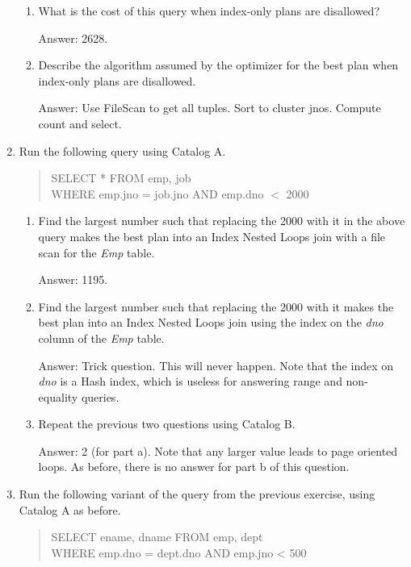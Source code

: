 \begin{enumerate}
\begin{enumerate}
\item
What is the cost of this query when index-only plans are disallowed?

Answer: 2628.

\item
Describe the algorithm assumed by the optimizer for the best plan when
index-only plans are disallowed.

Answer: Use FileScan to get all tuples.  Sort to cluster jnos.
Compute count and select.
\end{enumerate}


\item
Run the following query using Catalog A.
\begin{quote}
	SELECT * FROM emp, job\\
	WHERE emp.jno = job.jno AND emp.dno $<$ 2000
\end{quote}

\begin{enumerate}
\item
Find the largest number such that replacing the 2000 with it in the
above query makes the best plan into an Index Nested Loops join with a
file scan for the {\em Emp} table.

Answer: 1195.

\item
Find the largest number such that replacing the 2000 with it makes the
best plan into an Index Nested Loops join using the index on the {\em
dno} column of the {\em Emp} table.

Answer: Trick question.  This will never happen.  Note that the index
on {\em dno} is a Hash index, which is useless for answering range and
non-equality queries.

\item
Repeat the previous two questions using Catalog B.

Answer: 2 (for part a).  Note that any larger value leads to page oriented
loops.  As before, there is no answer for part b of this question.

\end{enumerate}


\item

Run the following variant of the query from the previous exercise, using
Catalog A as before.
\begin{quote}
        SELECT ename, dname FROM emp, dept\\
        WHERE emp.dno = dept.dno AND emp.jno < 500
\end{quote}


\end{enumerate}
